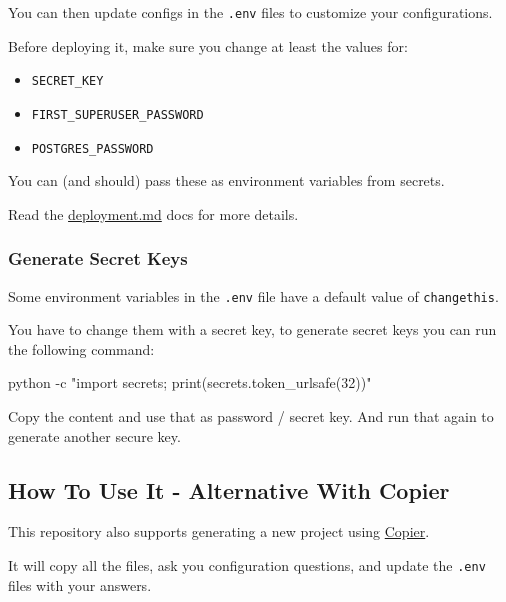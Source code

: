 \documentclass[
]{article}
\newenvironment{Shaded}{}{}
\newcommand{\AttributeTok}[1]{\textcolor[rgb]{0.49,0.56,0.16}{#1}}
\newcommand{\ExtensionTok}[1]{#1}
\newcommand{\StringTok}[1]{\textcolor[rgb]{0.25,0.44,0.63}{#1}}
\providecommand{\tightlist}{%
  \setlength{\itemsep}{0pt}\setlength{\parskip}{0pt}}
\begin{document}
You can then update configs in the \texttt{.env} files to customize your
configurations.

Before deploying it, make sure you change at least the values for:

\begin{itemize}
\tightlist
\item
  \texttt{SECRET\_KEY}
\item
  \texttt{FIRST\_SUPERUSER\_PASSWORD}
\item
  \texttt{POSTGRES\_PASSWORD}
\end{itemize}

You can (and should) pass these as environment variables from secrets.

Read the \href{./deployment.md}{deployment.md} docs for more details.

\hypertarget{generate-secret-keys}{%
\subsubsection{Generate Secret Keys}\label{generate-secret-keys}}

Some environment variables in the \texttt{.env} file have a default
value of \texttt{changethis}.

You have to change them with a secret key, to generate secret keys you
can run the following command:

\hypertarget{cb9}{}
\begin{Shaded}
\begin{Highlighting}[]
\ExtensionTok{python} \AttributeTok{{-}c} \StringTok{"import secrets; print(secrets.token\_urlsafe(32))"}
\end{Highlighting}
\end{Shaded}

Copy the content and use that as password / secret key. And run that
again to generate another secure key.

\hypertarget{how-to-use-it---alternative-with-copier}{%
\subsection{How To Use It - Alternative With
Copier}\label{how-to-use-it---alternative-with-copier}}

This repository also supports generating a new project using
\href{https://copier.readthedocs.io}{Copier}.

It will copy all the files, ask you configuration questions, and update
the \texttt{.env} files with your answers.
\end{document}
